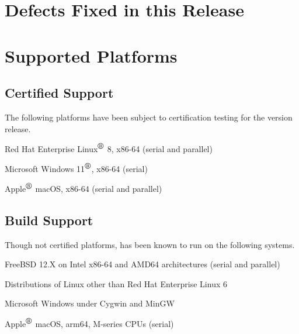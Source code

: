 \documentclass[letterpaper]{scrartcl}
\begin{document}
\newpage
\section{Defects Fixed in this Release}


\newpage
\section{Supported Platforms}
\subsection*{Certified Support}
The following platforms have been subject to certification testing for the
\Xyce{} version \XyceVersionVar{} release.
\begin{XyceItemize}
  \item Red Hat Enterprise Linux${}^{\mbox{\textregistered}}$ 8, x86-64 (serial and parallel)
  \item Microsoft Windows 11${}^{\mbox{\textregistered}}$, x86-64 (serial)
  \item Apple${}^{\mbox{\textregistered}}$ macOS, x86-64 (serial and parallel)
\end{XyceItemize}


\subsection*{Build Support}
Though not certified platforms, \Xyce{} has been known to run on the following
systems.
\begin{XyceItemize}
  \item FreeBSD 12.X on Intel x86-64 and AMD64 architectures (serial
    and parallel)
  \item Distributions of Linux other than Red Hat Enterprise Linux 6
  \item Microsoft Windows under Cygwin and MinGW
  \item Apple${}^{\mbox{\textregistered}}$ macOS, arm64, M-series CPUs (serial)
\end{XyceItemize}
\end{document}
